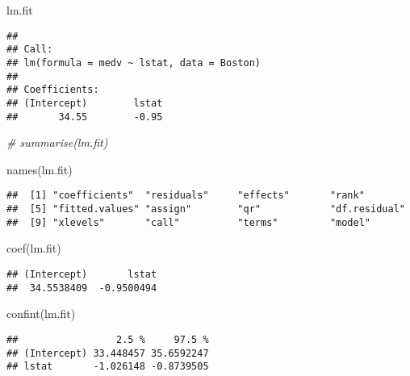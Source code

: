 \documentclass[
]{article}
\newenvironment{Shaded}{\begin{snugshade}}{\end{snugshade}}
\newcommand{\CommentTok}[1]{\textcolor[rgb]{0.56,0.35,0.01}{\textit{#1}}}
\newcommand{\FunctionTok}[1]{\textcolor[rgb]{0.00,0.00,0.00}{#1}}
\newcommand{\NormalTok}[1]{#1}
\begin{document}
\begin{Shaded}
\begin{Highlighting}[]
\NormalTok{lm.fit}
\end{Highlighting}
\end{Shaded}

\begin{verbatim}
## 
## Call:
## lm(formula = medv ~ lstat, data = Boston)
## 
## Coefficients:
## (Intercept)        lstat  
##       34.55        -0.95
\end{verbatim}

\begin{Shaded}
\begin{Highlighting}[]
\CommentTok{\# summarise(lm.fit)}
\end{Highlighting}
\end{Shaded}

\begin{Shaded}
\begin{Highlighting}[]
\FunctionTok{names}\NormalTok{(lm.fit)}
\end{Highlighting}
\end{Shaded}

\begin{verbatim}
##  [1] "coefficients"  "residuals"     "effects"       "rank"         
##  [5] "fitted.values" "assign"        "qr"            "df.residual"  
##  [9] "xlevels"       "call"          "terms"         "model"
\end{verbatim}

\begin{Shaded}
\begin{Highlighting}[]
\FunctionTok{coef}\NormalTok{(lm.fit)}
\end{Highlighting}
\end{Shaded}

\begin{verbatim}
## (Intercept)       lstat 
##  34.5538409  -0.9500494
\end{verbatim}

\begin{Shaded}
\begin{Highlighting}[]
\FunctionTok{confint}\NormalTok{(lm.fit)}
\end{Highlighting}
\end{Shaded}

\begin{verbatim}
##                 2.5 %     97.5 %
## (Intercept) 33.448457 35.6592247
## lstat       -1.026148 -0.8739505
\end{verbatim}
\end{document}
